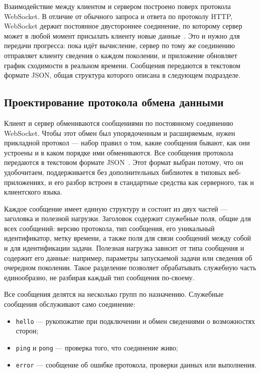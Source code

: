 \documentclass[14pt, a4paper]{extarticle}
\begin{document}
Взаимодействие между клиентом и сервером построено поверх протокола WebSocket.
В отличие от обычного запроса и ответа по протоколу HTTP, WebSocket держит
постоянное двустороннее соединение, по которому сервер может в любой момент
присылать клиенту новые данные~\cite{rfc6455}. Это и нужно для передачи
прогресса: пока идёт вычисление, сервер по тому же соединению отправляет клиенту
сведения о каждом поколении, и приложение обновляет график сходимости в реальном
времени. Сообщения передаются в текстовом формате JSON, общая структура которого
описана в следующем подразделе.

\subsection{Проектирование протокола обмена данными}
\label{subsec:protocol-design}

Клиент и сервер обмениваются сообщениями по постоянному соединению WebSocket.
Чтобы этот обмен был упорядоченным и расширяемым, нужен прикладной протокол ---
набор правил о том, какие сообщения бывают, как они устроены и в каком порядке
ими обмениваются. Все сообщения протокола передаются в текстовом формате
JSON~\cite{rfc8259}. Этот формат выбран потому, что он удобочитаем, поддерживается без дополнительных
библиотек в типовых веб-приложениях, и его разбор встроен в стандартные средства
как серверного, так и клиентского языка.

Каждое сообщение имеет единую структуру и состоит из двух частей --- заголовка и
полезной нагрузки. Заголовок содержит служебные поля, общие для всех сообщений:
версию протокола, тип сообщения, его уникальный идентификатор, метку времени, а
также поля для связи сообщений между собой и для идентификации задачи. Полезная
нагрузка зависит от типа сообщения и содержит его данные: например, параметры
запускаемой задачи или сведения об очередном поколении. Такое разделение
позволяет обрабатывать служебную часть единообразно, не разбирая каждый тип
сообщения по-своему.

Все сообщения делятся на несколько групп по назначению. Служебные сообщения
обслуживают само соединение:
\begin{itemize}
  \item \texttt{hello} --- рукопожатие при подключении и обмен сведениями о
  возможностях сторон;
  \item \texttt{ping} и \texttt{pong} --- проверка того, что соединение живо;
  \item \texttt{error} --- сообщение об ошибке протокола, проверки данных или
  выполнения.
\end{itemize}
\end{document}
